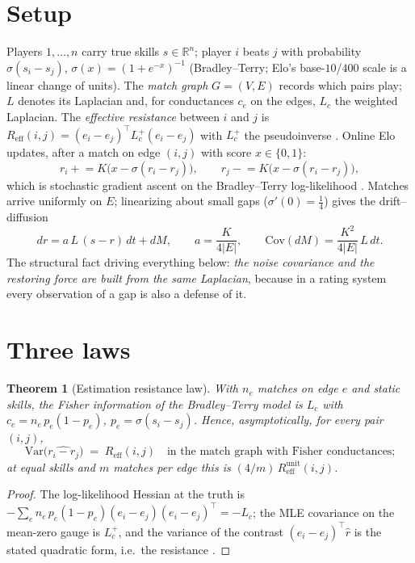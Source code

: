 \documentclass[11pt]{article}
\newtheorem{theorem}{Theorem}
\newcommand{\Reff}{R_{\mathrm{eff}}}
\newcommand{\Var}{\mathrm{Var}}
\begin{document}
\section{Setup}\label{sec:setup}

Players $1,\dots,n$ carry true skills $s \in \mathbb{R}^n$; player $i$
beats $j$ with probability $\sigma(s_i - s_j)$, $\sigma(x) = (1 +
e^{-x})^{-1}$ (Bradley--Terry; Elo's base-$10$/$400$ scale is a linear
change of units). The \emph{match graph} $G = (V, E)$ records which pairs
play; $L$ denotes its Laplacian and, for conductances $c_e$ on the edges,
$L_c$ the weighted Laplacian. The \emph{effective resistance} between $i$
and $j$ is $\Reff(i,j) = (e_i - e_j)^\top L_c^{+} (e_i - e_j)$ with
$L_c^{+}$ the pseudoinverse \cite{doylesnell1984}. Online Elo updates,
after a match on edge $(i,j)$ with score $x \in \{0,1\}$:
\[
r_i \mathrel{+}= K\big(x - \sigma(r_i - r_j)\big), \qquad
r_j \mathrel{-}= K\big(x - \sigma(r_i - r_j)\big),
\]
which is stochastic gradient ascent on the Bradley--Terry log-likelihood
\cite{mandt2017}. Matches arrive uniformly on $E$; linearizing about
small gaps ($\sigma'(0) = \tfrac14$) gives the drift--diffusion
\begin{equation}\label{eq:lin}
dr = a\,L\,(s - r)\,dt + dM, \qquad a = \frac{K}{4|E|}, \qquad
\mathrm{Cov}(dM) = \frac{K^2}{4|E|}\,L\,dt .
\end{equation}
The structural fact driving everything below: \emph{the noise covariance
and the restoring force are built from the same Laplacian}, because in a
rating system every observation of a gap is also a defense of it.

\section{Three laws}\label{sec:laws}

\begin{theorem}[Estimation resistance law]\label{thm:est}
With $n_e$ matches on edge $e$ and static skills, the Fisher information
of the Bradley--Terry model is $L_c$ with $c_e = n_e\, p_e(1-p_e)$, $p_e =
\sigma(s_i - s_j)$. Hence, asymptotically, for every pair $(i,j)$,
\[
\Var\big(\widehat{r_i - r_j}\big) \;=\; \Reff(i,j)
\quad\text{in the match graph with Fisher conductances;}
\]
at equal skills and $m$ matches per edge this is $(4/m)\,
\Reff^{\mathrm{unit}}(i,j)$.
\end{theorem}

\begin{proof}
The log-likelihood Hessian at the truth is $-\sum_e n_e\, p_e(1-p_e)(e_i -
e_j)(e_i - e_j)^\top = -L_c$; the MLE covariance on the mean-zero gauge is
$L_c^{+}$, and the variance of the contrast $(e_i - e_j)^\top \hat r$ is
the stated quadratic form, i.e.\ the resistance \cite{ghoshboydsaberi2008}.
\end{proof}
\end{document}
